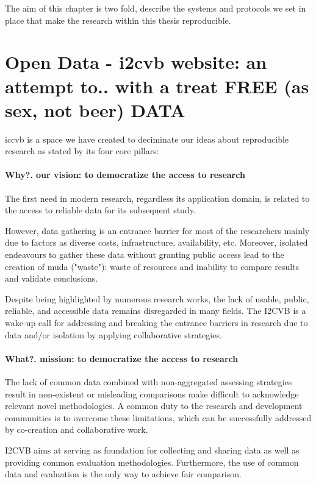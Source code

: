 The aim of this chapter is two fold,
describe the systems and protocols we set
in place that make the research within this thesis reproducible. 


\section{Open Data - i2cvb website: an attempt to.. with a treat FREE (as sex, not beer) DATA}
\acs{iccvb} is a space we have created to deciminate our ideas about
reproducible research as stated by its four core pillars: 

\paragraph{Why?. our vision: to democratize the access to research}
The first need in modern research, regardless its application domain, is related to the access to reliable data for its subsequent study.

However, data gathering is an entrance barrier for most of the researchers mainly due to factors as diverse costs, infrastructure, availability, etc. Moreover, isolated endeavours to gather these data without granting public access lead to the creation of muda ("waste"): waste of resources and inability to compare results and validate conclusions.

Despite being highlighted by numerous research works, the lack of usable, public, reliable, and accessible data remains disregarded in many fields. The I2CVB is a wake-up call for addressing and breaking the entrance barriers in research due to data and/or isolation by applying collaborative strategies.

\paragraph{What?. mission: to democratize the access to research}
The lack of common data combined with non-aggregated assessing strategies result in non-existent or misleading comparisons make difficult to acknowledge relevant novel methodologies. A common duty to the research and development communities is to overcome these limitations, which can be successfully addressed by co-creation and collaborative work.

I2CVB aims at serving as foundation for collecting and sharing data as well as providing common evaluation methodologies. Furthermore, the use of common data and evaluation is the only way to achieve fair comparison.

